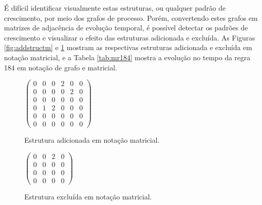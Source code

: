 \documentclass[12pt,a4paper]{article}
\begin{document}
É difícil identificar visualmente estas estruturas, ou qualquer padrão de
crescimento, por meio dos grafos de processo. Porém, convertendo estes grafos
em matrizes de adjacência de evolução temporal, é possível detectar os padrões
de crescimento e visualizar o efeito das estruturas adicionada e
excluída. As Figuras \ref{fig:addstructm} e \ref{fig:excstructm} mostram
as respectivas estruturas adicionada e excluída em notação matricial, e
a Tabela \ref{tab:mr184} mostra a evolução no tempo da regra 184 em notação
de grafo e matricial.

\begin{figure}[htp]
\begin{minipage}[b]{0.5\linewidth}
\begin{center}
\begin{math}
\begin{pmatrix}
0 & 0 & 0 & 2 & 0 & 0 \\
0 & 0 & 0 & 0 & 2 & 0 \\
0 & 0 & 0 & 0 & 0 & 0 \\
0 & 1 & 2 & 0 & 0 & 0 \\
0 & 0 & 0 & 0 & 0 & 0 \\
0 & 0 & 0 & 0 & 0 & 0
\end{pmatrix}
\end{math}
\caption{Estrutura adicionada em notação matricial.}
\label{fig:addstructm}
\end{center}
\end{minipage}
\hspace{0.5cm}
\begin{minipage}[b]{0.5\linewidth}
\begin{center}
\begin{math}
\begin{pmatrix}
0 & 0 & 2 & 0 \\
0 & 0 & 0 & 0 \\
0 & 0 & 0 & 0 \\
0 & 0 & 0 & 0
\end{pmatrix}
\end{math}
\caption{Estrutura excluída em notação matricial.}
\label{fig:excstructm}
\end{center}
\end{minipage}
\end{figure}
\end{document}
